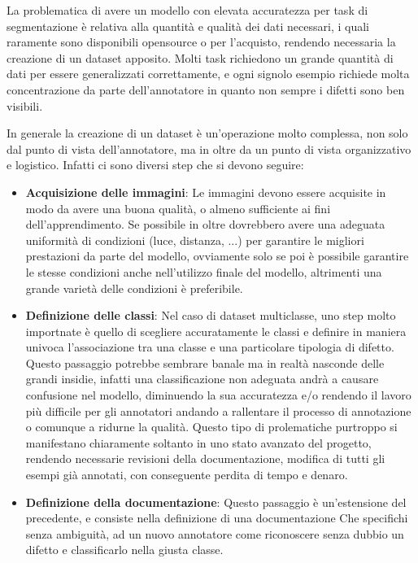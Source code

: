 La problematica di avere un modello con elevata accuratezza per task di segmentazione è relativa alla quantità e qualità dei dati necessari,
i quali raramente sono disponibili opensource o per l'acquisto, rendendo necessaria la creazione di un dataset apposito.
Molti task richiedono un grande quantità di dati per essere generalizzati correttamente, e ogni signolo esempio richiede molta concentrazione
da parte dell'annotatore in quanto non sempre i difetti sono ben visibili. 

In generale la creazione di un dataset è un'operazione molto complessa, non solo dal punto di vista dell'annotatore, ma in oltre da un punto di vista
organizzativo e logistico. Infatti ci sono diversi step che si devono seguire:
\begin{itemize}
    \item \textbf{Acquisizione delle immagini}: Le immagini devono essere acquisite in modo da avere una buona qualità, o almeno sufficiente ai fini dell'apprendimento.
        Se possibile in oltre dovrebbero avere una adeguata uniformità di condizioni (luce, distanza, ...) per garantire le migliori prestazioni da parte del modello,
        ovviamente solo se poi è possibile garantire le stesse condizioni anche nell'utilizzo finale del modello, altrimenti una grande varietà delle condizioni
        è preferibile.
    \item \textbf{Definizione delle classi}: Nel caso di dataset multiclasse, uno step molto importnate è quello di scegliere accuratamente le classi
        e definire in maniera univoca l'associazione tra una classe e una particolare tipologia di difetto. Questo passaggio potrebbe sembrare banale ma in realtà
        nasconde delle grandi insidie, infatti una classificazione non adeguata andrà a causare confusione nel modello, diminuendo la sua accuratezza e/o 
        rendendo il lavoro più difficile per gli annotatori andando a rallentare il processo di annotazione o comunque a ridurne la qualità.
        Questo tipo di prolematiche purtroppo si manifestano chiaramente soltanto in uno stato avanzato del progetto,
        rendendo necessarie revisioni della documentazione, modifica di tutti gli esempi già annotati, con conseguente perdita di tempo e denaro.
    \item \textbf{Definizione della documentazione}: Questo passaggio è un'estensione del precedente, e consiste nella definizione di una documentazione
        Che specifichi senza ambiguità, ad un nuovo annotatore come riconoscere senza dubbio un difetto e classificarlo nella giusta classe.

\end{itemize}
